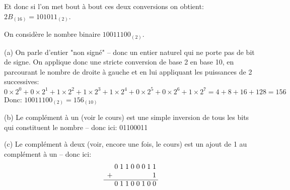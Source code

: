 \documentclass[11pt,a4paper]{exam}
\begin{document}
\begin{questions}
\begin{spacing}{1}
\begin{solution}
					Et donc si l'on met bout à bout ces deux conversions on obtient: $2B_{(16)} = 101011_{(2)}$.
					
				\end{solution}
		
		
			On considère le nombre binaire $10011100_{(2)}$.
			
				           	\begin{solution}
				(a) On parle d'entier "non signé" -- donc un entier naturel qui ne porte pas de bit de signe. On applique donc une stricte conversion de base 2 en base 10, en parcourant le nombre de droite à gauche et en lui appliquant les puissances de 2 successives:
				\[ 0 \times 2^0 + 0 \times 2^1 + 1 \times 2^2 + 1 \times 2^3 + 1 \times 2^4 + 0 \times 2^5 + 0 \times 2^6 + 1 \times 2^7 = 4 + 8 + 16 + 128 = 156\]
				Donc: $10011100_{(2)} = 156_{(10)}$
				
				(b) Le complément à un (voir le cours) est une simple inversion de tous les bits qui constituent le nombre -- donc ici: 01100011
				
				(c) Le complément à deux (voir, encore une fois, le cours) est un ajout de 1 au complément à un -- donc ici:
					\[
				\begin{array}{r *{9}{@{\;}c}}
					& 0 & 1 & 1 & 0 & 0 & 0 & 1 & 1 \\
					+ &  &  &  &  &  &  &  & 1 \\
					\cline{1-9}
					& 0 & 1 & 1 & 0 & 0 & 1 & 0 & 0 \\
				\end{array}
				\]
				

\end{solution}
\end{spacing}
\end{questions}
\end{document}
